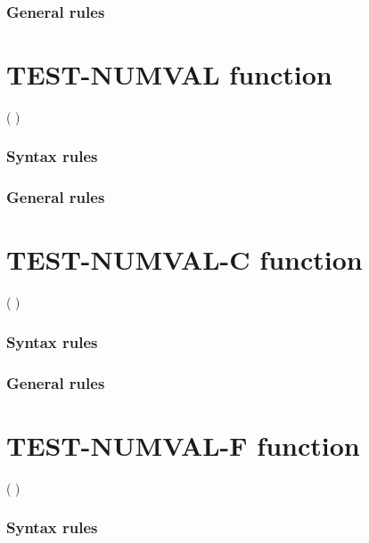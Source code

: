 \subsubsection{General rules}

\section{TEST-NUMVAL function}

\begin{syntax}
    ( \argument )
\end{syntax}

\subsubsection{Syntax rules}

\subsubsection{General rules}

\section{TEST-NUMVAL-C function}

\begin{syntax}
    ( \argument \argument )
\end{syntax}

\subsubsection{Syntax rules}

\subsubsection{General rules}

\section{TEST-NUMVAL-F function}

\begin{syntax}
    ( \argument )
\end{syntax}

\subsubsection{Syntax rules}

